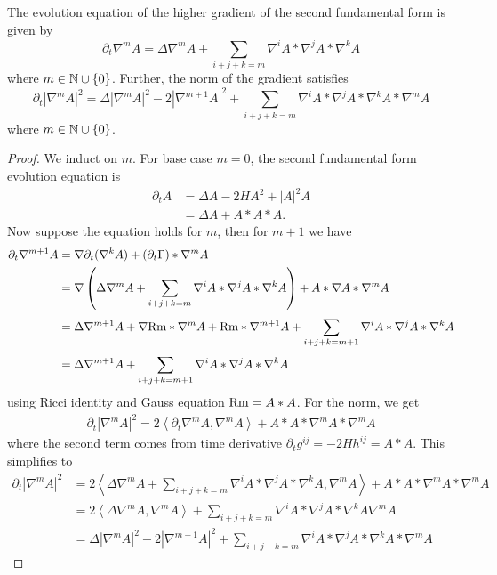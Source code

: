 \begin{lemma}
    The evolution equation of the higher gradient of the second fundamental form is given by 
    \begin{equation}
        \partial_{t}\nabla^{m}A = \Delta \nabla^{m}A + \sum_{i+j+k =m}^{}\nabla^{i}A* \nabla^{j}A*\nabla^{k}A 
    \end{equation}
    where $ m \in \mathbb{N} \cup \{0\} $. Further, the norm of the gradient satisfies 
    \begin{equation}
        \partial_{t}|\nabla^{m}A|^{2} = \Delta |\nabla^{m}A|^{2}- 2 |\nabla^{m+1}A|^{2} +\sum_{i+j+k =m}^{}\nabla^{i}A* \nabla^{j}A*\nabla^{k}A* \nabla^{m}A \label{normnablaA}
    \end{equation}
    where $ m \in \mathbb{N} \cup \{0\} $.
    
\end{lemma}
\begin{proof}
    We induct on $ m $. For base case $ m = 0 $, the second fundamental form evolution equation is 
    \begin{align*}
        \partial_{t} A & = \Delta A -2H A^{2} + |A|^{2}A \\
        & = \Delta A + A*A*A. 
    \end{align*}
    Now suppose the equation holds for $ m $, then for $m +1 $ we have \begin{align*}
        \partial_{t}\nabla^{m+1}A & = \nabla \partial_{t} (\nabla^{k}A) + (\partial_{t}\Gamma)* \nabla^{m}A \\
        & = \nabla \left(\Delta \nabla^{m}A + \sum_{i+j+k=m}^{}\nabla^{i}A * \nabla^{j}A * \nabla^{k}A\right) + A * \nabla A * \nabla^{m}A \\
        & = \Delta \nabla^{m+1}A + \nabla \text{Rm} * \nabla^{m}A + \text{Rm}* \nabla^{m+1}A + \sum_{i+j+k =m+1}^{}\nabla^{i}A* \nabla^{j}A*\nabla^{k}A \\
        & = \Delta \nabla^{m+1}A + \sum_{i+j+k =m+1}^{}\nabla^{i}A* \nabla^{j}A*\nabla^{k}A
    \end{align*}
    using Ricci identity and Gauss equation $ \text{Rm} = A*A $. For the norm, we get \begin{align*}
        \partial_{t}|\nabla^{m}A|^{2} = 2\left<\partial_{t}\nabla^{m}A, \nabla^{m}A  \right> + A*A* \nabla^{m}A * \nabla^{m}A
    \end{align*}
    where the second term comes from time derivative $ \partial_{t}g^{ij} = -2Hh^{ij} = A*A $. This simplifies to \begin{align*}
        \partial_{t}|\nabla^{m}A|^{2} & = 2\left< \Delta \nabla^{m}A + \sum_{i+j+k=m}^{}\nabla^{i}A * \nabla^{j}A* \nabla^{k}A, \nabla^{m}A  \right> + A*A*\nabla^{m}A * \nabla^{m}A \\
        & = 2\left< \Delta \nabla^{m}A , \nabla^{m}A \right> + \sum_{i+j+k=m}^{}\nabla^{i}A * \nabla^{j}A* \nabla^{k}A \nabla^{m}A \\
        & = \Delta|\nabla^{m}A|^{2} - 2|\nabla^{m+1}A|^{2} + \sum_{i+j+k=m}^{}\nabla^{i}A * \nabla^{j}A* \nabla^{k}A* \nabla^{m}A
    \end{align*}
\end{proof}
